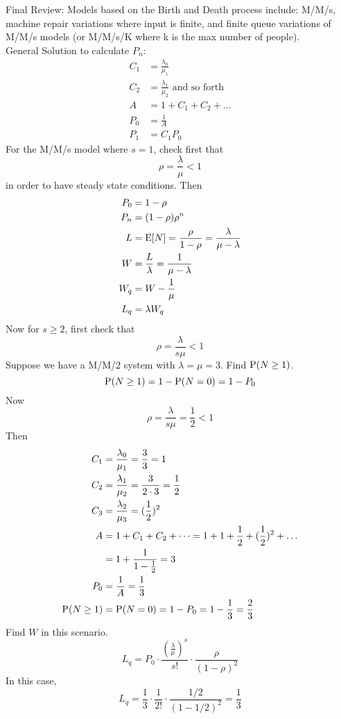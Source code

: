 \documentclass[12pt]{article}
\begin{document}
Final Review: Models based on the Birth and Death process include: M/M/s, machine repair variations where input is finite, and finite queue variations of M/M/s models (or M/M/s/K where k is the max number of people). \\
General Solution to calculate $P_n$: $$ \begin{aligned} C_1 &= \frac{\lambda_0}{\mu_1} \\ C_2 &= \frac{\lambda_1}{\mu_2} \text{ and so forth } \\ A &= 1 + C_1 + C_2 + \dots \\ P_0 &= \frac{1}{A} \\ P_1 &= C_1P_0 \end{aligned} $$ 
For the M/M/s model where $s=1$, check first that $$\rho = \frac{\lambda}{\mu} < 1$$ in order to have steady state conditions. Then $$ \begin{aligned} P_0 &= 1 - \rho \\ P_n &= (1-\rho)\rho^n \\ L &= \mathrm{E}[ N ] = \frac{\rho}{1-\rho} = \frac{\lambda}{\mu - \lambda} \\ W &= \frac{L}{\lambda} = \frac{1}{\mu - \lambda} \\ W_q &= W - \frac{1}{\mu} \\ L_q &= \lambda W_q \end{aligned} $$ 
Now for $s \geq 2$, first check that $$ \rho = \frac{\lambda}{s\mu} < 1 $$ 
Suppose we have a M/M/2 system with $\lambda = \mu = 3$. Find $\mathrm{P}( N \geq 1 )$. $$ \mathrm{P}( N \geq 1 ) = 1 - \mathrm{P}( N=0 ) = 1 - P_0 $$ 
Now $$ \rho = \frac{\lambda}{s\mu} = \frac{1}{2} < 1 $$
Then $$ \begin{aligned} C_1 &= \frac{\lambda_0}{\mu_1} = \frac{3}{3} = 1 \\ C_2 &= \frac{\lambda_1}{\mu_2} = \frac{3}{2 \cdot 3} = \frac{1}{2} \\ C_3&= \frac{\lambda_2}{\mu_3} = (\frac{1}{2})^2 \\ A &= 1 + C_1 + C_2 + \dots = 1 + 1 + \frac{1}{2} + (\frac{1}{2})^2 + \dots \\ &= 1 + \frac{1}{1-\frac{1}{2}} = 3 \\ P_0 &= \frac{1}{A} = \frac{1}{3} \\ \mathrm{P}( N \geq 1 ) &= \mathrm{P}( N=0 ) = 1 - P_0 = 1 - \frac{1}{3} = \frac{2}{3} \end{aligned} $$ 
Find $W$ in this scenario. $$ L_q = P_0 \cdot \frac{(\frac{\lambda}{\mu})^s}{s!} \cdot \frac{\rho}{(1-\rho)^2} $$ In this case, $$ L_q = \frac{1}{3} \cdot \frac{1}{2!} \cdot \frac{1/2}{(1-1/2)^2} = \frac{1}{3} $$ 
\end{document}
